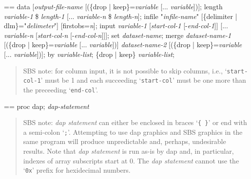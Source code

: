 \documentclass{book}
\makeatletter
\newcommand\Texinfocommandstyletextvar[1]{{\normalfont{}\textsl{#1}}}%
\newenvironment{Texinfopreformatted}{%
  \par\GNUTobeylines\obeyspaces\frenchspacing\parskip=\z@\parindent=\z@}{}
{\catcode`\^^M=13 \gdef\GNUTobeylines{\catcode`\^^M=13 \def^^M{\null\par}}}
\newenvironment{Texinfoindented}{\begin{list}{}{}\item\relax}{\end{list}}
\renewcommand{\_}{\Texinfounderscore\discretionary{}{}{}}
\makeatother
\begin{document}
\begin{Texinfoindented}
\begin{Texinfopreformatted}%
data [\Texinfocommandstyletextvar{output-file-name} [(\{drop | keep\}=\Texinfocommandstyletextvar{variable} [... \Texinfocommandstyletextvar{variable}])];
length \Texinfocommandstyletextvar{variable-1} \$ \Texinfocommandstyletextvar{length-1} [... \Texinfocommandstyletextvar{variable-n} \$ \Texinfocommandstyletextvar{length-n}];
infile "\Texinfocommandstyletextvar{infile-name}" [\{delimiter | dlm\}="\Texinfocommandstyletextvar{delimeter}"]
                       [firstobs=\Texinfocommandstyletextvar{n}];
input \Texinfocommandstyletextvar{variable-1} [\Texinfocommandstyletextvar{start-col-1} [-\Texinfocommandstyletextvar{end-col-1}]]
      [... \Texinfocommandstyletextvar{variable-n} [\Texinfocommandstyletextvar{start-col-n} [-\Texinfocommandstyletextvar{end-col-n}]]];
set \Texinfocommandstyletextvar{dataset-name};
merge \Texinfocommandstyletextvar{dataset-name-1} [(\{drop | keep\}=\Texinfocommandstyletextvar{variable} [... \Texinfocommandstyletextvar{variable}])]
     \Texinfocommandstyletextvar{dataset-name-2} [(\{drop | keep\}=\Texinfocommandstyletextvar{variable} [... \Texinfocommandstyletextvar{variable}])];
by \Texinfocommandstyletextvar{variable-list};
\{drop | keep\} \Texinfocommandstyletextvar{variable-list};

\end{Texinfopreformatted}
\end{Texinfoindented}

\begin{quote}
SBS note: for column input, it is not possible to skip columns, i.e.,
`\texttt{start-col-1}' must be 1 and each succeeding `\texttt{start-col}'
must be one more than the preceeding `\texttt{end-col}'.
\end{quote}

\begin{Texinfoindented}
\begin{Texinfopreformatted}%
proc dap;
\Texinfocommandstyletextvar{dap-statement}

\end{Texinfopreformatted}
\end{Texinfoindented}

\begin{quote}
SBS note: \Texinfocommandstyletextvar{dap statement} can either be enclosed in braces `\texttt{\{\ \}}' or
end with a semi-colon `\texttt{;}'. Attempting to use dap graphics and SBS graphics in the
same program will produce unpredictable and, perhaps, undesirable results. Note
that \Texinfocommandstyletextvar{dap statement} is run as-is by dap and, in particular, indexes of array
subscripts start at 0. The \Texinfocommandstyletextvar{dap statement} cannot use
the `\texttt{0x}' prefix for hexidecimal numbers.
\end{quote}
\end{document}
